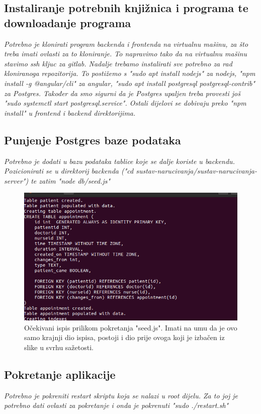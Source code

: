     \subsection{Instaliranje potrebnih knjižnica i programa te downloadanje programa}
    \textit{Potrebno je klonirati program backenda i frontenda na virtualnu mašinu, za što treba imati ovlasti za to kloniranje. To napravimo tako da na virtualnu mašinu stavimo ssh kljuc za gitlab. Nadalje trebamo instalirati sve potrebno za rad kloniranoga repozitorija. To postižemo s "sudo apt install nodejs" za nodejs, "npm install -g @angular/cli" za angular, "sudo apt install postgresql postgresql-contrib" za Postgres. Također da smo sigurni da je Postgres upaljen treba provesti još "sudo systemctl start postgresql.service". Ostali dijelovi se dobivaju preko "npm install" u frontend i backend direktorijima.}

    \subsection{Punjenje Postgres baze podataka}
    \textit{Potrebno je dodati u bazu podataka tablice koje se dalje koriste u backendu. Pozicionirati se u direktorij backenda ("cd sustav-narucivanja/sustav-narucivanja-server") te zatim "node db/seed.js"}
    \begin{figure}[H]
        \includegraphics[width=\textwidth]{slike/deploy/seed.png} %
        \caption{Očekivani ispis prilikom pokretanja "seed.js". Imati na umu da je ovo samo krajnji dio ispisa, postoji i dio prije ovoga koji je izbačen iz slike u svrhu sažetosti.}
        \label{fig:struktura} %
    \end{figure}

    \subsection{Pokretanje aplikacije}
    \textit{Potrebno je pokreniti restart skriptu koja se nalazi u root dijelu. Za to joj je potrebno dati ovlasti za pokretanje i onda je pokrenuti "sudo ./restart.sh" }
			

			
			\eject 